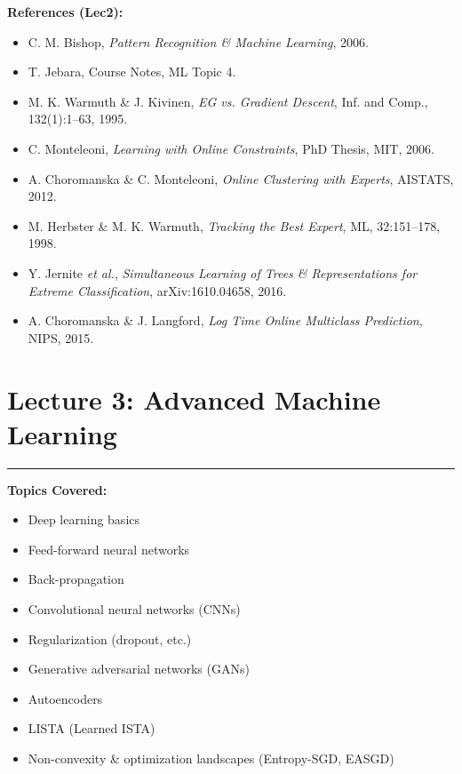 \documentclass[10pt]{article}
\begin{document}
\begin{multicols}{2}
\vfill
\textbf{References (Lec2):}
\begin{itemize}\setlength{\itemsep}{0pt}
\item C. M. Bishop, \emph{Pattern Recognition \& Machine Learning}, 2006.
\item T. Jebara, Course Notes, ML Topic 4.
\item M. K. Warmuth \& J. Kivinen, \emph{EG vs. Gradient Descent}, Inf. and Comp., 132(1):1--63, 1995.
\item C. Monteleoni, \emph{Learning with Online Constraints}, PhD Thesis, MIT, 2006.
\item A. Choromanska \& C. Monteleoni, \emph{Online Clustering with Experts}, AISTATS, 2012.
\item M. Herbster \& M. K. Warmuth, \emph{Tracking the Best Expert}, ML, 32:151--178, 1998.
\item Y. Jernite \emph{et al.}, \emph{Simultaneous Learning of Trees \& Representations for Extreme Classification}, arXiv:1610.04658, 2016.
\item A. Choromanska \& J. Langford, \emph{Log Time Online Multiclass Prediction}, NIPS, 2015.
\end{itemize}

\columnbreak

\section*{Lecture 3: Advanced Machine Learning}
\vspace{-0.5em}
\hrule
\vspace{1em}

\textbf{Topics Covered:}
\begin{itemize}
\item Deep learning basics
\item Feed-forward neural networks
\item Back-propagation
\item Convolutional neural networks (CNNs)
\item Regularization (dropout, etc.)
\item Generative adversarial networks (GANs)
\item Autoencoders
\item LISTA (Learned ISTA)
\item Non-convexity \& optimization landscapes (Entropy-SGD, EASGD)
\end{itemize}


\end{multicols}
\end{document}
